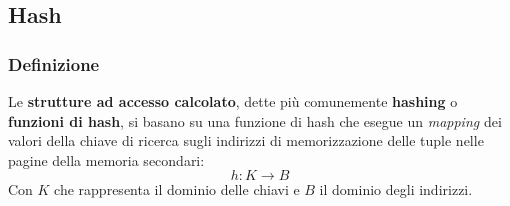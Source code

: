 \documentclass[a4paper]{article}
\begin{document}
	\subsection{Hash}
	
	\subsubsection{Definizione}
	
	Le \textbf{strutture ad accesso calcolato}, dette più comunemente \textcolor{Red3}{\textbf{hashing}} o \textbf{funzioni di hash}, si basano su una funzione di hash che esegue un \emph{mapping} dei valori della chiave di ricerca sugli indirizzi di memorizzazione delle tuple nelle pagine della memoria secondari:
	\begin{equation*}
		h : K \rightarrow B
	\end{equation*}
	Con $K$ che rappresenta il dominio delle chiavi e $B$ il dominio degli indirizzi.\newline
	
\end{document}
